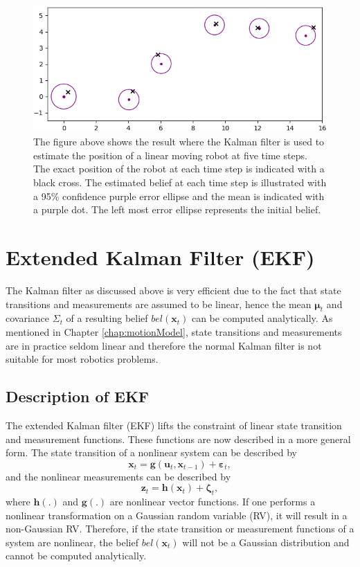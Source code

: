 \documentclass[12pt,oneside,openany,a4paper, %
afrikaans,english,
]{memoir}
\numberwithin{equation}{chapter}
\begin{document}
{\begin{figure}[H]

  \includegraphics[width=0.8\linewidth]{Figures/result_kalmanfilter.png}
  \centering
  \caption[The result where the Kalman filter is applied to solve a linear localisation problem]{
The figure above shows the result where the Kalman filter is used to estimate the position of a linear moving robot at five time steps. The exact position of the robot at each time step is indicated with a black cross. The estimated belief at each time step is illustrated with a 95\% confidence purple error ellipse and the mean is indicated with a purple dot. The left most error ellipse represents the initial belief.}
\label{fig:resultKF}
\end{figure}

\section{Extended Kalman Filter (EKF)}\label{sec:EKF}
The Kalman filter as discussed above is very efficient due to the fact that state transitions and measurements are assumed to be linear, hence the mean $\bm{\mu}_t$ and covariance $\Sigma_t$ of a resulting belief $bel(\bm{x}_t)$ can be computed analytically.
As mentioned in Chapter \ref{chap:motionModel}, state transitions and measurements are in practice seldom linear and therefore the normal Kalman filter is not suitable for most robotics problems. 

\subsection{Description of EKF}
The extended Kalman filter (EKF) lifts the constraint of linear state transition and measurement functions. These functions are now described in a more general form. The state transition of a nonlinear system can be described by
\begin{equation}
\bm{x}_t = \bm{g}(\bm{u}_t, \bm{x}_{t-1}) + \bm{\varepsilon}_t,
\end{equation}
and the nonlinear measurements can be described by
\begin{equation}
\bm{z}_t = \bm{h}(\bm{x}_t) + \bm{\zeta}_t,
\end{equation}
where $\bm{h}(.)$ and $\bm{g}(.)$ are nonlinear vector functions. If one performs a nonlinear transformation on a Gaussian random variable (RV), it will result in a non-Gaussian RV. Therefore, if the state transition or measurement functions of a system are nonlinear, the belief $bel(\bm{x}_t)$ will not be a Gaussian distribution and cannot be computed analytically.

}
\end{document}
